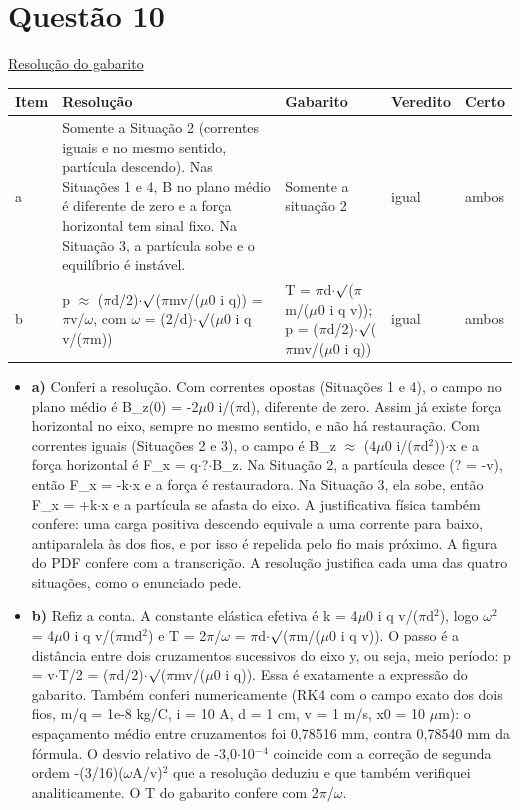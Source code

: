 \documentclass{article}%
\begin{document}
\section*{Questão 10}%
\href{https://poliedroresolve.sistemapoliedro.com.br/vestibulares/ime/2027/ime-2-fase-dia-2-27-10-2026-2-fase-dia-2/dissertativa-10-fisica-2-fase-dia-2-ime-2027}{Resolução do gabarito}\par\smallskip%
\begin{longtable}{@{}p{} p{} p{} p{} p{}@{}}\toprule Item & Resolução & Gabarito & Veredito & Certo \\ \midrule
a & Somente a Situação 2 (correntes iguais e no mesmo sentido, partícula descendo). Nas Situações 1 e 4, B no plano médio é diferente de zero e a força horizontal tem sinal fixo. Na Situação 3, a partícula sobe e o equilíbrio é instável. & Somente a situação 2 & igual & ambos \\
b & p $\approx$ ($\pi$d/2)$\cdot$$\surd$($\pi$mv/($\mu$0 i q)) = $\pi$v/$\omega$, com $\omega$ = (2/d)$\cdot$$\surd$($\mu$0 i q v/($\pi$m)) & T = $\pi$d$\cdot$$\surd$($\pi$m/($\mu$0 i q v)); p = ($\pi$d/2)$\cdot$$\surd$($\pi$mv/($\mu$0 i q)) & igual & ambos \\
\bottomrule\end{longtable}%
\begin{itemize}%
\item%
\textbf{a)} Conferi a resolução. Com correntes opostas (Situações 1 e 4), o campo no plano médio é B\_z(0) = -2$\mu$0 i/($\pi$d), diferente de zero. Assim já existe força horizontal no eixo, sempre no mesmo sentido, e não há restauração. Com correntes iguais (Situações 2 e 3), o campo é B\_z $\approx$ (4$\mu$0 i/($\pi$d$^2$))$\cdot$x e a força horizontal é F\_x = q$\cdot$?$\cdot$B\_z. Na Situação 2, a partícula desce (? = -v), então F\_x = -k$\cdot$x e a força é restauradora. Na Situação 3, ela sobe, então F\_x = +k$\cdot$x e a partícula se afasta do eixo. A justificativa física também confere: uma carga positiva descendo equivale a uma corrente para baixo, antiparalela às dos fios, e por isso é repelida pelo fio mais próximo. A figura do PDF confere com a transcrição. A resolução justifica cada uma das quatro situações, como o enunciado pede.%
\item%
\textbf{b)} Refiz a conta. A constante elástica efetiva é k = 4$\mu$0 i q v/($\pi$d$^2$), logo $\omega$$^2$ = 4$\mu$0 i q v/($\pi$md$^2$) e T = 2$\pi$/$\omega$ = $\pi$d$\cdot$$\surd$($\pi$m/($\mu$0 i q v)). O passo é a distância entre dois cruzamentos sucessivos do eixo y, ou seja, meio período: p = v$\cdot$T/2 = ($\pi$d/2)$\cdot$$\surd$($\pi$mv/($\mu$0 i q)). Essa é exatamente a expressão do gabarito. Também conferi numericamente (RK4 com o campo exato dos dois fios, m/q = 1e{-}8 kg/C, i = 10 A, d = 1 cm, v = 1 m/s, x0 = 10 $\mu$m): o espaçamento médio entre cruzamentos foi 0,78516 mm, contra 0,78540 mm da fórmula. O desvio relativo de -3,0$\cdot$10$^{-}$$^{4}$ coincide com a correção de segunda ordem -(3/16)($\omega$A/v)$^2$ que a resolução deduziu e que também verifiquei analiticamente. O T do gabarito confere com 2$\pi$/$\omega$.%
\end{itemize}%
\end{document}
